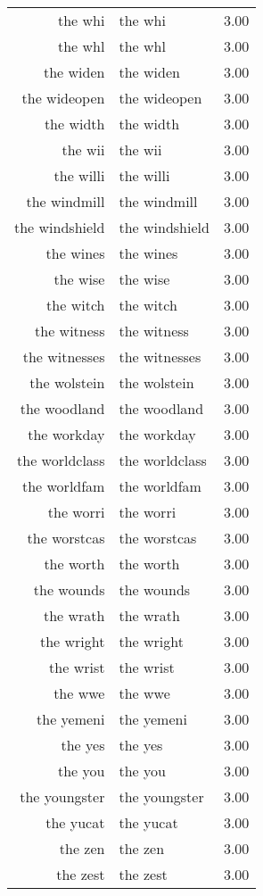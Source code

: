 \begin{table}[ht]
\begin{tabular}{rlr}
  the whi & the whi & 3.00 \\ 
  the whl & the whl & 3.00 \\ 
  the widen & the widen & 3.00 \\ 
  the wideopen & the wideopen & 3.00 \\ 
  the width & the width & 3.00 \\ 
  the wii & the wii & 3.00 \\ 
  the willi & the willi & 3.00 \\ 
  the windmill & the windmill & 3.00 \\ 
  the windshield & the windshield & 3.00 \\ 
  the wines & the wines & 3.00 \\ 
  the wise & the wise & 3.00 \\ 
  the witch & the witch & 3.00 \\ 
  the witness & the witness & 3.00 \\ 
  the witnesses & the witnesses & 3.00 \\ 
  the wolstein & the wolstein & 3.00 \\ 
  the woodland & the woodland & 3.00 \\ 
  the workday & the workday & 3.00 \\ 
  the worldclass & the worldclass & 3.00 \\ 
  the worldfam & the worldfam & 3.00 \\ 
  the worri & the worri & 3.00 \\ 
  the worstcas & the worstcas & 3.00 \\ 
  the worth & the worth & 3.00 \\ 
  the wounds & the wounds & 3.00 \\ 
  the wrath & the wrath & 3.00 \\ 
  the wright & the wright & 3.00 \\ 
  the wrist & the wrist & 3.00 \\ 
  the wwe & the wwe & 3.00 \\ 
  the yemeni & the yemeni & 3.00 \\ 
  the yes & the yes & 3.00 \\ 
  the you & the you & 3.00 \\ 
  the youngster & the youngster & 3.00 \\ 
  the yucat & the yucat & 3.00 \\ 
  the zen & the zen & 3.00 \\ 
  the zest & the zest & 3.00 \\ 

\end{tabular}
\end{table}
